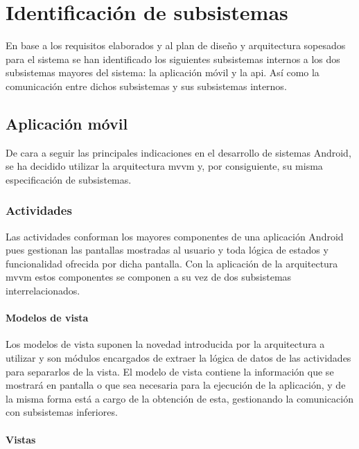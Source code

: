 \chapter{Identificación de subsistemas}
\label{ch:subsistemas}

En base a los requisitos elaborados y al plan de diseño y arquitectura sopesados para el sistema se han identificado los siguientes subsistemas internos a los dos subsistemas mayores del sistema: la aplicación móvil y la \acrshort{api}. Así como la comunicación entre dichos subsistemas y sus subsistemas internos.

\section{Aplicación móvil}
\label{sec:subsistema_app}

De cara a seguir las principales indicaciones en el desarrollo de sistemas Android, se ha decidido utilizar la arquitectura \acrshort{mvvm}\cite{mvvm2021} y, por consiguiente, su misma especificación de subsistemas.

\subsection{Actividades}

Las actividades conforman los mayores componentes de una aplicación Android pues gestionan las pantallas mostradas al usuario y toda lógica de estados y funcionalidad ofrecida por dicha pantalla. Con la aplicación de la arquitectura \acrshort{mvvm} estos componentes se componen a su vez de dos subsistemas interrelacionados.

\subsubsection{Modelos de vista}

Los modelos de vista suponen la novedad introducida por la arquitectura a utilizar y son módulos encargados de extraer la lógica de datos de las actividades para separarlos de la vista. El modelo de vista contiene la información que se mostrará en pantalla o que sea necesaria para la ejecución de la aplicación, y de la misma forma está a cargo de la obtención de esta, gestionando la comunicación con subsistemas inferiores.

\subsubsection{Vistas}


